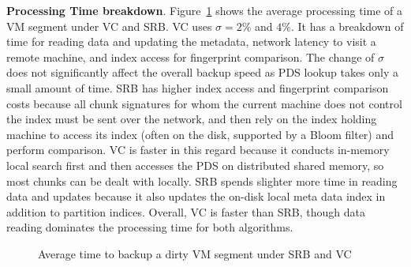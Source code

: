{\bf Processing Time breakdown}.
Figure~\ref{fig:vc_srb_combined} shows
the  average  processing  time of  a VM segment under VC and SRB. 
VC uses $\sigma=2\%$ and $4\%$.
It has a breakdown of time for reading data and updating the metadata, network latency to visit
a remote machine, and index access for fingerprint comparison.
The change of $\sigma$ does not significantly affect the overall backup speed as
PDS lookup takes only a small amount of time.
SRB has higher index access and fingerprint comparison costs because all chunk signatures for whom the current
machine does not control the index must be sent over the network, and then rely
on the index holding machine to access its index (often on the disk, supported by a Bloom filter) 
and perform comparison.
VC is faster in this regard because it conducts in-memory local search first and then
accesses  the PDS on distributed shared memory, so most chunks can be dealt with locally.  
SRB spends  slighter more time in  reading data and updates because it also updates the on-disk
local meta data index in addition to partition indices.
Overall,  VC is faster than SRB, though data reading dominates the processing time for both algorithms.

\begin{figure}[htbp]
  \centering
  \caption{Average time to backup a dirty VM segment under SRB and VC}
  \label{fig:vc_srb_combined}
\end{figure}





